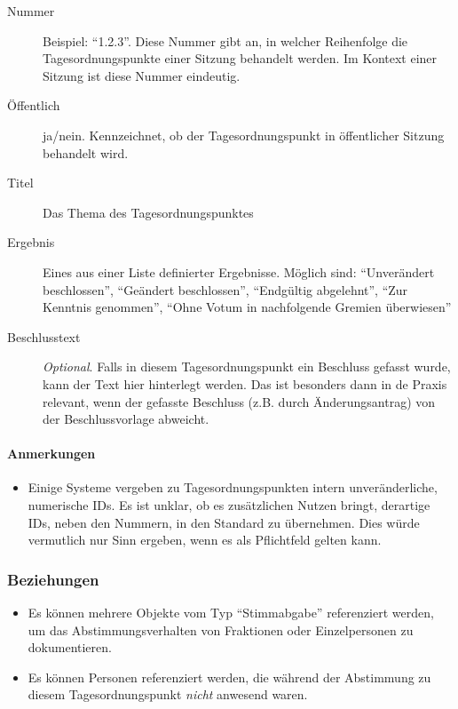 \documentclass[,a4paper]{article}
\begin{document}
\begin{description}
\item[Nummer]
Beispiel: ``1.2.3''. Diese Nummer gibt an, in welcher Reihenfolge die
Tagesordnungspunkte einer Sitzung behandelt werden. Im Kontext einer
Sitzung ist diese Nummer eindeutig.
\item[Öffentlich]
ja/nein. Kennzeichnet, ob der Tagesordnungspunkt in öffentlicher Sitzung
behandelt wird.
\item[Titel]
Das Thema des Tagesordnungspunktes
\item[Ergebnis]
Eines aus einer Liste definierter Ergebnisse. Möglich sind:
``Unverändert beschlossen'', ``Geändert beschlossen'', ``Endgültig
abgelehnt'', ``Zur Kenntnis genommen'', ``Ohne Votum in nachfolgende
Gremien überwiesen''
\item[Beschlusstext]
\emph{Optional}. Falls in diesem Tagesordnungspunkt ein Beschluss
gefasst wurde, kann der Text hier hinterlegt werden. Das ist besonders
dann in de Praxis relevant, wenn der gefasste Beschluss (z.B. durch
Änderungsantrag) von der Beschlussvorlage abweicht.
\end{description}

\paragraph{Anmerkungen}

\begin{itemize}
\item
  Einige Systeme vergeben zu Tagesordnungspunkten intern
  unveränderliche, numerische IDs. Es ist unklar, ob es zusätzlichen
  Nutzen bringt, derartige IDs, neben den Nummern, in den Standard zu
  übernehmen. Dies würde vermutlich nur Sinn ergeben, wenn es als
  Pflichtfeld gelten kann.
\end{itemize}

\subsubsection{Beziehungen}

\begin{itemize}
\item
  Es können mehrere Objekte vom Typ ``Stimmabgabe'' referenziert werden,
  um das Abstimmungsverhalten von Fraktionen oder Einzelpersonen zu
  dokumentieren.
\item
  Es können Personen referenziert werden, die während der Abstimmung zu
  diesem Tagesordnungspunkt \emph{nicht} anwesend waren.
\end{itemize}
\end{document}
